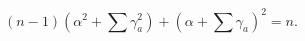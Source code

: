 \begin{equation}
(n-1)\left(\alpha^2+\sum\gamma_a^2\right)
+\left(\alpha+\sum\gamma_a\right)^2=n.
\label{eq:elcond}
\end{equation}

